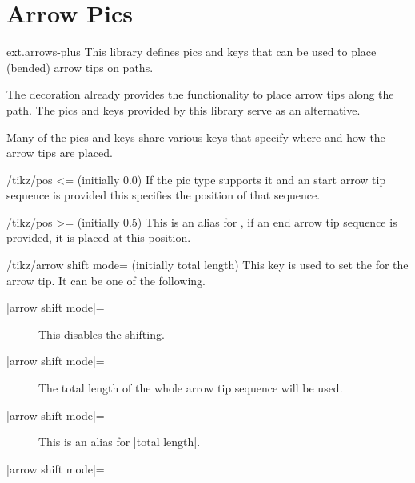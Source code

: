 %
%
%

\section{Arrow Pics}
\label{tikzlibrary:arrows}
\tikzset{external/export/.try=false}%
\begin{tikzlibrary}{ext.arrows-plus}
  This library defines pics and keys
  that can be used to place (bended) arrow tips on paths.
\end{tikzlibrary}

\begin{multicols}{2}
The  decoration
already provides the functionality to place arrow tips along the path.
The pics and keys provided by this library serve as an alternative.

Many of the pics and keys share various keys that specify
where and how the arrow tips are placed.
\begin{key}{/tikz/pos <= (initially 0.0)}
If the pic type supports it and an start arrow tip sequence is provided
this specifies the position of that sequence.
\end{key}
\begin{key}{/tikz/pos >= (initially 0.5)}
This is an alias for ,
if an end arrow tip sequence is provided, it is placed at this position.
\end{key}

\begin{key}{/tikz/arrow shift mode= (initially total length)}
This key is used to set the  for the arrow tip.
It can be one of the following.
\begin{description}
\item[|arrow shift mode|=]

  This disables the shifting.
\item[|arrow shift mode|=]

  The total length of the whole arrow tip sequence will be used.
\item[|arrow shift mode|=]

  This is an alias for |total length|.
\item[|arrow shift mode|=]


\end{description}
\end{key}
\end{multicols}
